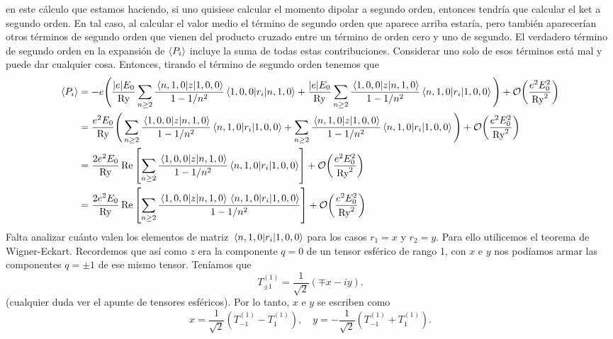 \documentclass[10pt, a4paper]{article}
\newcommand{\Ry}{\ensuremath{\text{Ry}}}
\numberwithin{equation}{subsection}
\begin{document}
en este cálculo que estamos haciendo, si uno quisiese calcular el momento
dipolar a segundo orden, entonces tendría que calcular el ket a segundo orden.
En tal caso, al calcular el valor medio el término de segundo orden que aparece
arriba estaría, pero también aparecerían otros términos de segundo orden que
vienen del producto cruzado entre un término de orden cero y uno de segundo. El
verdadero término de segundo orden en la expansión de $\expval{P_i}$ incluye la
suma de todas estas contribuciones. Considerar uno solo de esos términos está
mal y puede dar cualquier cosa. Entonces, tirando el término de segundo orden
tenemos que
\begin{align}
  \expval{P_i}
  &= -e\Bigg(
    \frac{\abs{e}E_0}{\Ry} \sum_{n \geq 2}
    \frac{\matrixel{n,1,0}{z}{1,0,0}}{1 - 1/n^2} \matrixel{1,0,0}{r_i}{n,1,0}
    + \frac{\abs{e}E_0}{\Ry} \sum_{n \geq 2} \frac{\matrixel{1,0,0}{z}{n,1,0}}
    {1 - 1/n^2} \matrixel{n,1,0}{r_i}{1,0,0} \Bigg)
    + \order{\frac{e^2E_0^2}{\Ry^2}} \nonumber \\
  &= \frac{e^2E_0}{\Ry}\Bigg(
    \sum_{n \geq 2} \frac{\matrixel{1,0,0}{z}{n,1,0}}{1 - 1/n^2}
    \matrixel{n,1,0}{r_i}{1,0,0} + \sum_{n \geq 2}
    \frac{\matrixel{n,1,0}{z}{1,0,0}} {1 - 1/n^2} \matrixel{n,1,0}{r_i}{1,0,0}
    \Bigg) + \order{\frac{e^2E_0^2}{\Ry^2}} \nonumber \\
  &= \frac{2e^2E_0}{\Ry}\Re\left[
    \sum_{n \geq 2} \frac{\matrixel{1,0,0}{z}{n,1,0}}{1 - 1/n^2}
    \matrixel{n,1,0}{r_i}{1,0,0}\right] + \order{\frac{e^2E_0^2}{\Ry^2}}
    \nonumber \\
  &= \frac{2e^2E_0}{\Ry}\Re\left[
    \sum_{n \geq 2} \frac{\matrixel{1,0,0}{z}{n,1,0}\matrixel{n,1,0}{r_i}{1,0,0}}{1 - 1/n^2}
    \right] + \order{\frac{e^2E_0^2}{\Ry^2}}
\end{align}
Falta analizar cuánto valen los elementos de matriz
$\matrixel{n,1,0}{r_i}{1,0,0}$ para los casos $r_1 = x$ y $r_2 = y$. Para ello
utilicemos el teorema de Wigner-Eckart. Recordemos que así como $z$ era la
componente $q = 0$ de un tensor esférico de rango 1, con $x$ e $y$ nos podíamos
armar las componentes $q = \pm1$ de ese mismo tensor. Teníamos que
\begin{equation}
  T^{(1)}_{\pm1} = \frac{1}{\sqrt{2}}\left(\mp x - iy\right).
\end{equation}
(cualquier duda ver el apunte de tensores esféricos).
Por lo tanto, $x$ e $y$ se escriben como
\begin{equation}
  x = \frac{1}{\sqrt{2}}\left(T^{(1)}_{-1} - T^{(1)}_{1}\right), \quad
  y = -\frac{1}{\sqrt{2}}\left(T^{(1)}_{-1} + T^{(1)}_{1}\right).
\end{equation}
\end{document}
